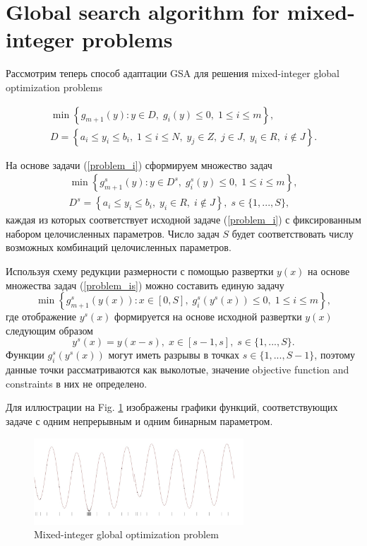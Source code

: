 \documentclass{llncs}
\begin{document}
\section{Global search algorithm for mixed-integer problems}

\Russian
Рассмотрим теперь способ адаптации GSA для решения mixed-integer global optimization problems 

\begin{gather}\label{problem_i}
\min{\left\{ g_{m+1}(y):y\in D, \; g_i(y)\leq 0, \; 1 \leq i \leq m\right\}},\\
D=\left\{a_i\leq y_i \leq b_i, \; 1\leq i \leq N, \; y_j \in Z, \; j \in J, \; y_i \in R, \; i \notin J \right\}.\nonumber
\end{gather}

На основе задачи (\ref{problem_i}) сформируем множество задач 
\begin{gather}\label{problem_is}
\min{\left\{ g_{m+1}^s(y):y\in D^s, \; g_i^s(y)\leq 0, \; 1 \leq i \leq m\right\}},\\
D^s=\left\{ a_i\leq y_i \leq b_i, \;  y_i \in R, \; i \notin J \right\}, \; s\in\{1,...,S\},\nonumber 
\end{gather}
каждая из которых соответствует исходной задаче (\ref{problem_i}) с фиксированным набором целочисленных параметров. Число задач $S$ будет соответствовать числу возможных комбинаций целочисленных параметров.

Используя схему редукции размерности с помощью развертки $y(x)$ на основе множества задач (\ref{problem_is}) можно составить единую задачу
\begin{equation}\label{problem_is1}
\min \left\{g_{m+1}^s(y(x)): x \in [0,S], \; g_i^s(y^s(x)) \leq 0, \; 1 \leq i \leq m\right\},
\end{equation}
где отображение $y^s(x)$  формируется на основе исходной развертки $y(x)$ следующим образом
\[
y^s(x)=y(x-s), \; x\in[s-1,s],\; s\in\{1,...,S\}.
\]
Функции $g_i^s(y^s(x))$ могут иметь разрывы в точках $s\in \{1,...,S-1\}$, поэтому данные точки рассматриваются как выколотые, значение objective function and constraints в них не определено.

Для иллюстрации на Fig. \ref{fig:1}  изображены графики функций, соответствующих задаче с одним непрерывным и одним бинарным параметром.

\begin{figure}[ht]
    \centering
    \includegraphics[width=0.7\textwidth]{fig1.jpg}
    \caption{Mixed-integer global optimization problem}
    \label{fig:1}
\end{figure}
\end{document}
